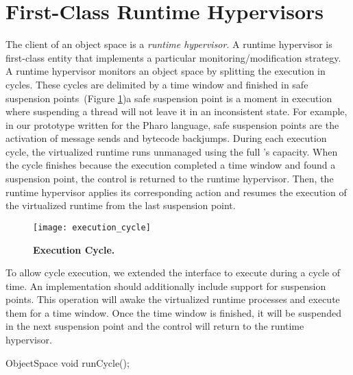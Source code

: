 
\section{First-Class Runtime Hypervisors}\label{sec:hypervisor}

The client of an object space is a \emph{runtime hypervisor}. A runtime hypervisor is first-class entity that implements a particular monitoring/modification strategy. A runtime hypervisor monitors an object space by splitting the execution in cycles. These cycles are delimited by a time window and finished in safe suspension points~(Figure \ref{fig:execution_cycle})\ie a safe suspension point is a moment in execution where suspending a thread will not leave it in an inconsistent state. For example, in our \Vtt prototype written for the Pharo language, safe suspension points are the activation of message sends and bytecode backjumps. During each execution cycle, the virtualized runtime runs unmanaged using the full \VM's capacity. When the cycle finishes because the execution completed a time window and found a suspension point, the control is returned to the runtime hypervisor. Then, the runtime hypervisor applies its corresponding action and resumes the execution of the virtualized runtime from the last suspension point.

\begin{figure}[ht]
\center
\texttt{[image: execution\_cycle]}
\caption{\textbf{Execution Cycle.} \label{fig:execution_cycle}}
\end{figure}

To allow cycle execution, we extended the  interface to execute during a cycle of time. An \Vtt implementation should additionally include support for suspension points. This operation will awake the virtualized runtime processes and execute them for a time window. Once the time window is finished, it will be suspended in the next suspension point and the control will return to the runtime hypervisor.

\begin{code}
ObjectSpace {
    void runCycle();
}
\end{code}


